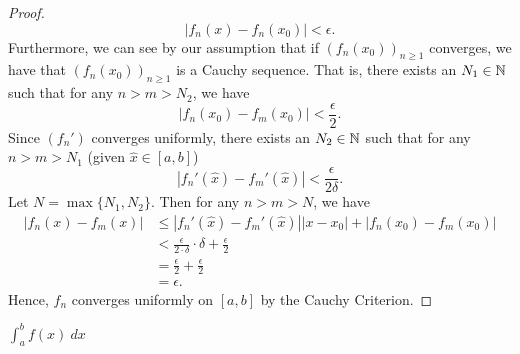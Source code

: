\documentclass[a4paper]{article}
\begin{document}
\begin{proof}
    \[  | {f}_{n}(x) - {f}_{n}({x}_{0}) |  < \epsilon. \]
    Furthermore, we can see by our assumption that if \( ({f}_{n}({x}_{0}))_{n \geq 1 } \) converges, we have that \( ({f}_{n}({x}_{0}))_{n \geq 1 } \) is a Cauchy sequence. That is, there exists an \( {N}_{1} \in \mathbb{N} \) such that for any \(  n > m > {N}_{2} \), we have 
    \[  | {f}_{n}({x}_{0}) - {f}_{m}({x}_{0}) |  < \frac{ \epsilon }{ 2 }. \]
    Since \( ({f}_{n}') \) converges uniformly, there exists an \( {N}_{2} \in \mathbb{N} \) such that for any \( n > m > {N}_{1} \) (given \( \hat{x} \in [a,b] \)) 
    \[  | {f}_{n}'(\hat{x}) - {f}_{m}'(\hat{x})  |  < \frac{ \epsilon }{ 2 \delta }.  \]
    Let \( N = \max \{ {N}_{1}, {N}_{2} \}  \). Then for any \( n > m > N \), we have 
    \begin{align*}
        | {f}_{n}(x) - {f}_{m}(x) | &\leq | {f}_{n}'(\hat{x}) - {f}_{m}'(\hat{x})  | | x - {x}_{0} |  + | {f}_{n}({x}_{0}) - {f}_{m}({x}_{0}) |  \\
                                    &< \frac{ \epsilon }{ 2 \cdot \delta }  \cdot \delta + \frac{ \epsilon  }{  2  }  \\
                                    &= \frac{ \epsilon }{ 2 }  + \frac{ \epsilon }{ 2 }  \\
                                    &= \epsilon.
    \end{align*}
    Hence, \( {f}_{n}  \) converges uniformly on \( [a,b] \) by the Cauchy Criterion.
\end{proof}

\( \int_{ a }^{ b } f(x) \ dx  \)
\end{document}
